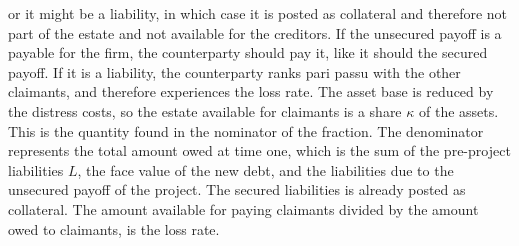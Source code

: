 \documentclass[../main.tex]{subfiles}
\begin{document}
        or it might be a liability, in which case it is posted as collateral 
        and therefore not part of the estate and not available for the creditors.
        If the unsecured payoff is a payable for the firm, the counterparty should pay it, like it should the secured payoff.
        If it is a liability, the counterparty ranks pari passu with the other claimants,
        and therefore experiences the loss rate. 
        The asset base is reduced by the distress costs, so the estate available for claimants
        is a share $\kappa$ of the assets. 
        This is the quantity found in the nominator of the fraction.
        The denominator represents the total amount owed at time one, 
        which is the sum of the pre-project liabilities $L$, the face value of the new debt, 
        and the liabilities due to the unsecured payoff of the project.
        The secured liabilities is already posted as collateral.
        The amount available for paying claimants divided by the amount owed to claimants, is the loss rate.
\end{document}
